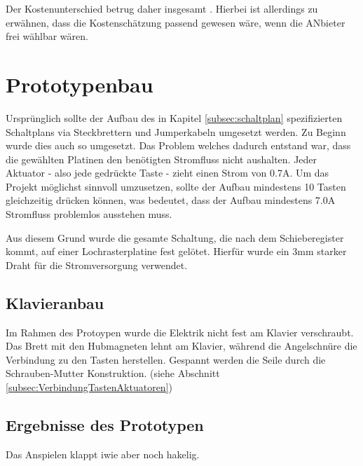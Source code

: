 Der Kostenunterschied betrug daher insgesamt .
Hierbei ist allerdings zu erwähnen, dass die Kostenschätzung passend gewesen wäre, wenn die ANbieter frei wählbar wären.

\section{Prototypenbau}
Ursprünglich sollte der Aufbau des in Kapitel \ref{subsec:schaltplan} spezifizierten Schaltplans via Steckbrettern und
Jumperkabeln umgesetzt werden.
Zu Beginn wurde dies auch so umgesetzt. Das Problem welches dadurch entstand war, dass die gewählten Platinen den
benötigten Stromfluss nicht aushalten.\newline
Jeder Aktuator - also jede gedrückte Taste - zieht einen Strom von 0.7A. Um das Projekt möglichst sinnvoll umzusetzen,
sollte der Aufbau mindestens 10 Tasten gleichzeitig drücken können, was bedeutet, dass der Aufbau mindestens 7.0A
Stromfluss problemlos ausstehen muss.

Aus diesem Grund wurde die gesamte Schaltung, die nach dem Schieberegister kommt, auf einer Lochrasterplatine fest gelötet.
Hierfür wurde ein 3mm starker Draht für die Stromversorgung verwendet.

\subsection{Klavieranbau}
Im Rahmen des Protoypen wurde die Elektrik nicht fest am Klavier verschraubt.
Das Brett mit den Hubmagneten lehnt am Klavier, während die Angelschnüre die Verbindung zu den Tasten herstellen.
Gespannt werden die Seile durch die Schrauben-Mutter Konstruktion. (siehe Abschnitt \ref{subsec:VerbindungTastenAktuatoren})

\subsection{Ergebnisse des Prototypen}

Das Anspielen klappt iwie aber noch hakelig.


